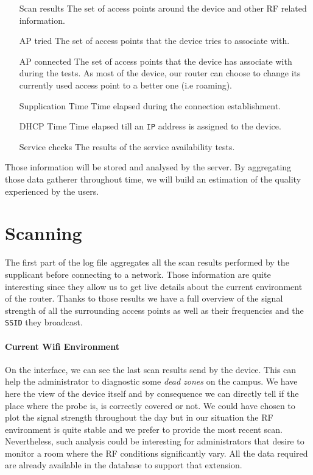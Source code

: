 \begin{itemize}
	\item[Scan results] The set of access points around the device and other RF related information.
	\item[AP tried]  The set of access points that the device tries to associate with.
	\item[AP connected] The set of access points that the device has associate with during the tests. As most of the device, our router can choose to change its currently used access point to a better one (i.e roaming).
	\item[Supplication Time] Time elapsed during the connection establishment.
	\item [DHCP Time] Time elapsed till an \texttt{IP} address is assigned to the device.
	\item [Service checks] The results of the service availability tests.
\end{itemize}

Those information will be stored and analysed by the server. By aggregating those data gatherer throughout time, we will build an estimation of the quality experienced by the users.

\section{Scanning}
The first part of the log file aggregates all the scan results performed by the supplicant before connecting to a network. Those information are quite interesting since they allow us to get live details about the current environment of the router. Thanks to those results we have a full overview of the signal strength of all the surrounding access points as well as their frequencies and the \texttt{SSID} they broadcast. 

\paragraph*{Current Wifi Environment} On the interface, we can see the last scan results send by the device. This can help the administrator to diagnostic some \emph{dead zones} on the campus. We have here the view of the device itself and by consequence we can directly tell if the place where the probe is, is correctly covered or not. We could have chosen to plot the signal strength throughout the day but in our situation the RF environment is quite stable and we prefer to provide the most recent scan. Nevertheless, such analysis could be interesting for administrators that desire to monitor a room where the RF conditions significantly vary. All the data required are already available in the database to support that extension.


